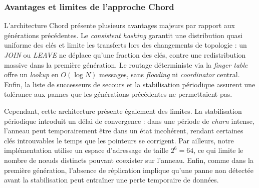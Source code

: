 \subsubsection{Avantages et limites de l'approche Chord}

L'architecture Chord pr\'esente plusieurs avantages majeurs par rapport aux g\'en\'erations pr\'ec\'edentes. Le \emph{consistent hashing} garantit une distribution quasi uniforme des cl\'es et limite les transferts lors des changements de topologie : un \emph{JOIN} ou \emph{LEAVE} ne d\'eplace qu'une fraction des cl\'es, contre une redistribution massive dans la premi\`ere g\'en\'eration. Le routage d\'eterministe via la \emph{finger table} offre un \emph{lookup} en \(O(\log N)\) messages, sans \emph{flooding} ni \emph{coordinator} central. Enfin, la liste de successeurs de secours et la stabilisation p\'eriodique assurent une tol\'erance aux pannes que les g\'en\'erations pr\'ec\'edentes ne permettaient pas.

Cependant, cette architecture pr\'esente \'egalement des limites. La stabilisation p\'eriodique introduit un d\'elai de convergence : dans une p\'eriode de \emph{churn} intense, l'anneau peut temporairement \^etre dans un \'etat incoh\'erent, rendant certaines cl\'es introuvables le temps que les pointeurs se corrigent. Par ailleurs, notre impl\'ementation utilise un espace d'adressage de taille \(2^6 = 64\), ce qui limite le nombre de n\oe uds distincts pouvant coexister sur l'anneau. Enfin, comme dans la premi\`ere g\'en\'eration, l'absence de r\'eplication implique qu'une panne non d\'etect\'ee avant la stabilisation peut entra\^iner une perte temporaire de donn\'ees.